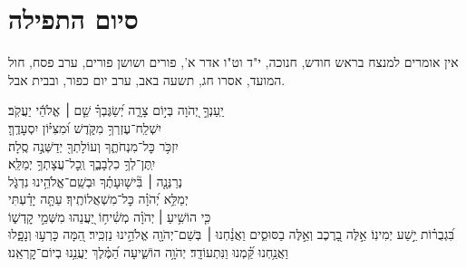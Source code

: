 \documentclass[twoside, openany, parskip=half, 11pt]{book}
\begin{document}
\hagbaha

\nextpage

\galila

\yehalelu

\negline
\kafdalet


\etzchaim






\section[סיום התפילה]{ סיום התפילה }
\label{ashrei}
\ashrei 

\begin{scriptsize} %
\textsf{
אין אומרים למנצח בראש חודש, חנוכה, י"ד וט"ו אדר א', פורים ושושן פורים, 
ערב פסח, חול המועד, אסרו חג, תשעה באב, ערב יום כפור, ובבית אבל.}

\end{scriptsize}

\begin{narrow}
\firstword{}\hfill \break
יַֽעַנְךָ֣ יְ֭הֹוָה בְּי֣וֹם צָרָ֑ה \hfill יְ֝שַׂגֶּבְךָ֗ שֵׁ֤ם ׀ אֱלֹהֵ֬י יַעֲקֹֽב׃\\
יִשְׁלַֽח־עֶזְרְךָ֥ מִקֹּ֑דֶשׁ \hfill וּ֝מִצִּיּ֗וֹן יִסְעָדֶֽךָּ׃\\
יִזְכֹּ֥ר כׇּל־מִנְחֹתֶ֑ךָ \hfill וְעוֹלָתְךָ֖ יְדַשְּׁנֶ֣ה סֶֽלָה׃\\
יִֽתֶּן־לְךָ֥ כִלְבָבֶ֑ךָ \hfill וְֽכׇל־עֲצָתְךָ֥ יְמַלֵּֽא׃\\
נְרַנְּנָ֤ה ׀ בִּ֘ישׁ֤וּעָתֶ֗ךָ \hfill וּבְשֵֽׁם־אֱלֹהֵ֥ינוּ נִדְגֹּ֑ל\\ יְמַלֵּ֥א יְ֝הֹוָ֗ה כׇּל־מִשְׁאֲלוֹתֶֽיךָ׃\hfill
עַתָּ֤ה יָדַ֗עְתִּי\\ כִּ֤י הוֹשִׁ֥יעַ ׀ יְהֹוָ֗ה מְשִׁ֫יח֥וֹ \hfill יַ֭עֲנֵהוּ מִשְּׁמֵ֣י קׇדְשׁ֑וֹ\\ בִּ֝גְבֻר֗וֹת יֵ֣שַׁע יְמִינֽוֹ׃\hfill
אֵ֣לֶּה בָ֭רֶכֶב וְאֵ֣לֶּה בַסּוּסִ֑ים וַאֲנַ֓חְנוּ ׀ בְּשֵׁם־יְהֹוָ֖ה אֱלֹהֵ֣ינוּ נַזְכִּֽיר׃\hfill
הֵ֭מָּה כָּרְע֣וּ וְנָפָ֑לוּ\\ וַאֲנַ֥חְנוּ קַּ֝֗מְנוּ וַנִּתְעוֹדָֽד׃\hfill
יְהֹוָ֥ה הוֹשִׁ֑יעָה הַ֝מֶּ֗לֶךְ יַעֲנֵ֥נוּ בְיוֹם־קׇרְאֵֽנוּ׃   \hfill \break
\end{narrow} 
\end{document}
